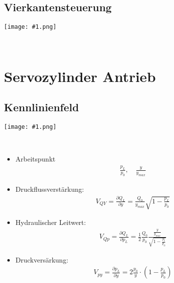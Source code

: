 \documentclass[landscape,a4paper,10pt]{article}
\newcommand{\graphiccol}[1]{
\noindent
\begin{minipage}{\columnwidth}
\centering
\texttt{[image: \#1.png]}
\end{minipage}
\medskip \\
}
\begin{document}
\begin{multicols*}{3}
\subsection{Vierkantensteuerung}
\graphiccol{vierkantensteuerung}




\section{Servozylinder Antrieb}



\subsection{Kennlinienfeld}
\graphiccol{kennlinienfeld}
\begin{itemize}
\item Arbeitspunkt
\begin{align*}
\frac{p_L}{p_0}, \quad \frac{y}{y_{max}}
\end{align*}
\item Druckflussverstärkung:
\begin{align*}
V_{QY} = 
\frac{\partial Q_L}{\partial y} = \frac{Q_0}{y_{max}} \sqrt{1-\frac{p_L}{p_0}}
\end{align*}
\item Hydraulischer Leitwert:
\begin{align*}
V_{Qp} = \frac{\partial Q_L}{\partial p_L} = \frac{1}{2} \frac{Q_0}{p_0} \frac{\frac{y}{y_{max}}}{\sqrt{1-\frac{p_l}{p_0}}}
\end{align*}
\item Druckversärkung:
\begin{align*}
V_{py} = \frac{\partial p_L}{\partial y} = 2 \frac{p_0}{y} \cdot \left(1-\frac{p_L}{p_0} \right)
\end{align*}
\end{itemize}




\end{multicols*}
\end{document}

